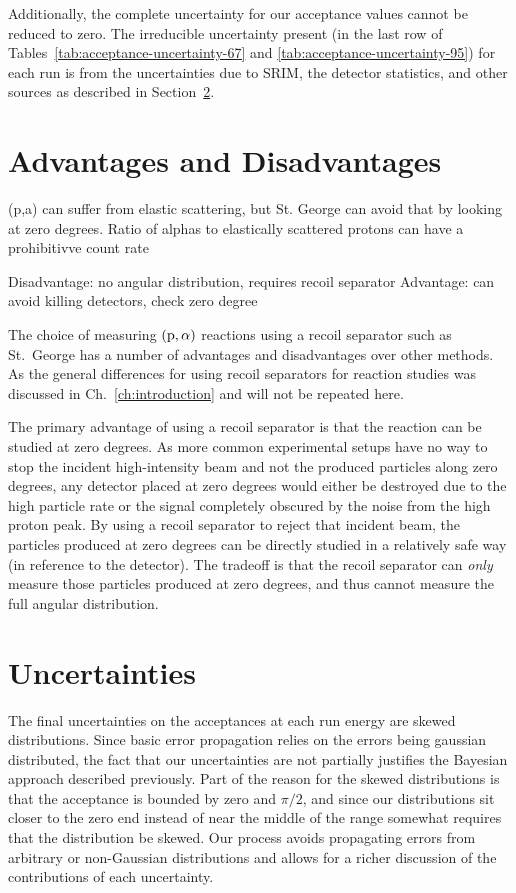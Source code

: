 Additionally, the complete uncertainty for our acceptance values cannot
be reduced to zero. The irreducible uncertainty present (in the last row
of Tables~\ref{tab:acceptance-uncertainty-67} and
\ref{tab:acceptance-uncertainty-95}) for each run is from the
uncertainties due to SRIM, the detector statistics, and other sources as
described in Section~\ref{sec:uncertainties}.


\section{Advantages and Disadvantages}
(p,a) can suffer from elastic scattering, but St. George can avoid that
by looking at zero degrees. Ratio of alphas to elastically scattered
protons can have a prohibitivve count rate

Disadvantage: no angular distribution, requires recoil separator
Advantage: can avoid killing detectors, check zero degree


The choice of measuring $({\rm p},\alpha)$ reactions using a recoil
separator such as St.\ George has a number of advantages and
disadvantages over other methods. As the general differences for using
recoil separators for reaction studies was discussed in
Ch.~\ref{ch:introduction} and will not be repeated here.

The primary advantage of using a recoil separator is that the reaction
can be studied at zero degrees. As more common experimental setups have
no way to stop the incident high-intensity beam and not the produced
particles along zero degrees, any detector placed at zero degrees would
either be destroyed due to the high particle rate or the signal
completely obscured by the noise from the high proton peak. By using a
recoil separator to reject that incident beam, the particles produced at
zero degrees can be directly studied in a relatively safe way (in
reference to the detector). The tradeoff is that the recoil separator
can \textit{only} measure those particles produced at zero degrees, and
thus cannot measure the full angular distribution.


\section{Uncertainties}
\label{sec:uncertainties}

The final uncertainties on the acceptances at each run energy are skewed
distributions. Since basic error propagation relies on the errors being
gaussian distributed, the fact that our uncertainties are not partially
justifies the Bayesian approach described previously. Part of the reason
for the skewed distributions is that the acceptance is bounded by zero
and $\pi/2$, and since our distributions sit closer to the zero end
instead of near the middle of the range somewhat requires that the
distribution be skewed. Our process avoids propagating errors from
arbitrary or non-Gaussian distributions and allows for a richer
discussion of the contributions of each uncertainty.

